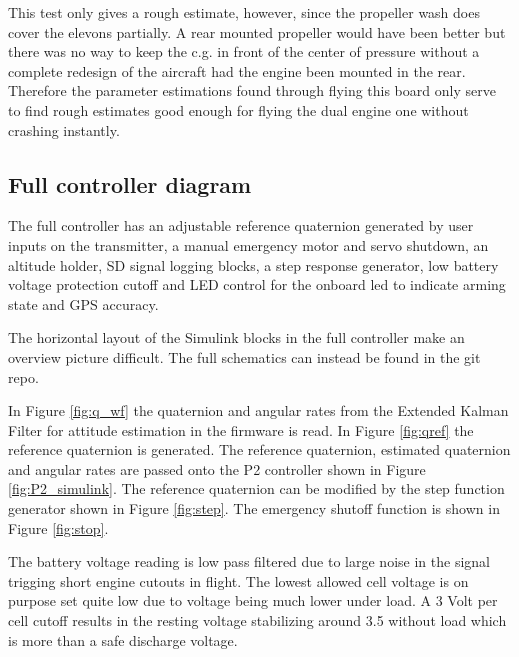 \documentclass{article}
\begin{document}
This test only gives a rough estimate, however, since the propeller wash does cover the elevons partially.
A rear mounted propeller would have been better but there was no way to keep the c.g. in front of the center of pressure without a complete redesign of the aircraft had the engine been mounted in the rear.
Therefore the parameter estimations found through flying this board only serve to find rough estimates good enough for flying the dual engine one without crashing instantly.

\subsection{Full controller diagram}
The full controller has an adjustable reference quaternion generated by user inputs on the transmitter, a manual emergency motor and servo shutdown, an altitude holder, SD signal logging blocks, a step response generator, low battery voltage protection cutoff and LED control for the onboard led to indicate arming state and GPS accuracy.

The horizontal layout of the Simulink blocks in the full controller make an overview picture difficult.
The full schematics can instead be found in the git repo.\cite{mycode}

In Figure \ref{fig:q_wf} the quaternion and angular rates from the Extended Kalman Filter for attitude estimation in the firmware is read.
In Figure \ref{fig:qref} the reference quaternion is generated.
The reference quaternion, estimated quaternion and angular rates are passed onto the P2 controller shown in Figure \ref{fig:P2_simulink}.
The reference quaternion can be modified by the step function generator shown in Figure \ref{fig:step}.
The emergency shutoff function is shown in Figure \ref{fig:stop}.

The battery voltage reading is low pass filtered due to large noise in the signal trigging short engine cutouts in flight.
The lowest allowed cell voltage is on purpose set quite low due to voltage being much lower under load.
A 3 Volt per cell cutoff results in the resting voltage stabilizing around 3.5 without load which is more than a safe discharge voltage.
\end{document}
